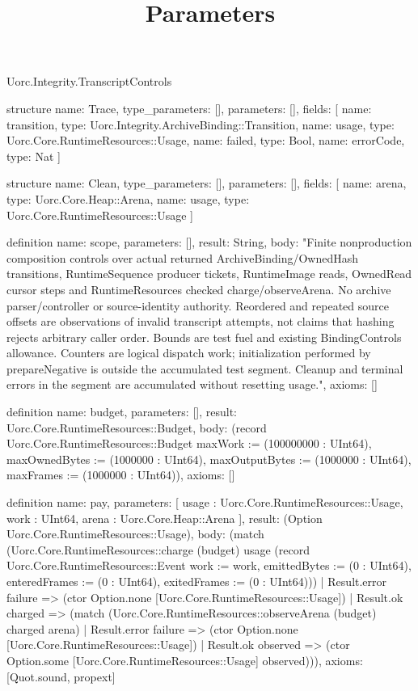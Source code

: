 \begin{lexlean}{Uorc.Integrity.TranscriptControls}
\title{Parameters}
\begin{semanticmodule}
structure{
  name: Trace,
  type_parameters: [],
  parameters: [],
  fields: [
    {name: transition, type: Uorc.Integrity.ArchiveBinding::Transition},
    {name: usage, type: Uorc.Core.RuntimeResources::Usage},
    {name: failed, type: Bool},
    {name: errorCode, type: Nat}
  ]
}

structure{
  name: Clean,
  type_parameters: [],
  parameters: [],
  fields: [
    {name: arena, type: Uorc.Core.Heap::Arena},
    {name: usage, type: Uorc.Core.RuntimeResources::Usage}
  ]
}

definition{
  name: scope,
  parameters: [],
  result: String,
  body: "Finite nonproduction composition controls over actual returned ArchiveBinding/OwnedHash transitions, RuntimeSequence producer tickets, RuntimeImage reads, OwnedRead cursor steps and RuntimeResources checked charge/observeArena. No archive parser/controller or source-identity authority. Reordered and repeated source offsets are observations of invalid transcript attempts, not claims that hashing rejects arbitrary caller order. Bounds are test fuel and existing BindingControls allowance. Counters are logical dispatch work; initialization performed by prepareNegative is outside the accumulated test segment. Cleanup and terminal errors in the segment are accumulated without resetting usage.",
  axioms: []
}

definition{
  name: budget,
  parameters: [],
  result: Uorc.Core.RuntimeResources::Budget,
  body: (record Uorc.Core.RuntimeResources::Budget {maxWork := (100000000 : UInt64), maxOwnedBytes := (1000000 : UInt64), maxOutputBytes := (1000000 : UInt64), maxFrames := (1000000 : UInt64)}),
  axioms: []
}

definition{
  name: pay,
  parameters: [
    usage : Uorc.Core.RuntimeResources::Usage,
    work : UInt64,
    arena : Uorc.Core.Heap::Arena
  ],
  result: (Option Uorc.Core.RuntimeResources::Usage),
  body: (match (Uorc.Core.RuntimeResources::charge (budget) usage (record Uorc.Core.RuntimeResources::Event {work := work, emittedBytes := (0 : UInt64), enteredFrames := (0 : UInt64), exitedFrames := (0 : UInt64)}))
    | Result.error failure => (ctor Option.none [Uorc.Core.RuntimeResources::Usage])
    | Result.ok charged => (match (Uorc.Core.RuntimeResources::observeArena (budget) charged arena)
      | Result.error failure => (ctor Option.none [Uorc.Core.RuntimeResources::Usage])
      | Result.ok observed => (ctor Option.some [Uorc.Core.RuntimeResources::Usage] observed))),
  axioms: [Quot.sound, propext]
}


\end{semanticmodule}
\end{lexlean}
